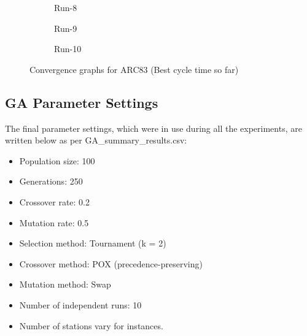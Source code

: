 \documentclass[12pt,a4paper]{article}
\begin{document}
\begin{figure}[H]
\begin{subfigure}[t]{0.32\textwidth}
\centering
{}
\caption{Run-8}
\end{subfigure}\hfill
\begin{subfigure}[t]{0.32\textwidth}
\centering
{}
\caption{Run-9}
\end{subfigure}\hfill
\begin{subfigure}[t]{0.32\textwidth}
\centering
{}
\caption{Run-10}
\end{subfigure}

\caption{Convergence graphs for ARC83 (Best cycle time so far)}
\label{fig:arc83-convergence}
\end{figure}


\par
\subsection{GA Parameter Settings}

The final parameter settings, which were in use during all the experiments, are written below as per GA\_summary\_results.csv:

\begin{itemize}
    \item Population size: 100
    \item Generations: 250
    \item Crossover rate: 0.2
    \item Mutation rate: 0.5
    \item Selection method: Tournament (k = 2)
    \item Crossover method: POX (precedence-preserving)
    \item Mutation method: Swap
    \item Number of independent runs: 10
    \item Number of stations vary for instances.
\end{itemize}
\end{document}
